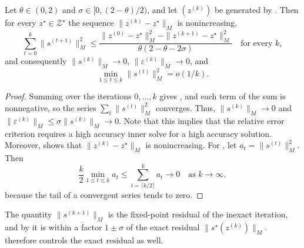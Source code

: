 \documentclass[11pt]{article}
\begin{document}
\begin{theorem}\label{thm:relative-error-criterion}
    Let $\theta \in (0, 2)$ and $\sigma \in [0, (2-\theta)/2)$, and let $(z^{(k)})$ be generated by .
    Then for every $z^\star \in \mathcal{Z}^\star$ the sequence $\|z^{(k)} - z^\star\|_M$ is nonincreasing,
    \begin{equation}\label{eq:convergence-of-fixed-point-residual}
        \sum_{t=0}^{k}\|s^{(t+1)}\|^2_M \leq \frac{\|z^{(0)} - z^\star\|_M^2 - \|z^{(k+1)} - z^\star\|_M^2}{\theta(2-\theta-2\sigma)}
        \quad\text{for every } k,
    \end{equation}
    and consequently $\|s^{(k)}\|_M \to 0$, $\|\varepsilon^{(k)}\|_M \to 0$, and
    \begin{equation}\label{eq:small-o-rate}
        \min_{1 \leq t \leq k} \|s^{(t)}\|_M^2 = o(1/k).
    \end{equation}
\end{theorem}
\begin{proof}
    Summing  over the iterations $0, \ldots, k$ gives , and each term of the sum is nonnegative, so the series $\sum_t \|s^{(t)}\|_M^2$ converges.
    Thus, $\|s^{(k)}\|_M \to 0$ and $\|\varepsilon^{(k)}\|_M \leq \sigma\|s^{(k)}\|_M \to 0$.
    Note that this implies that the relative error criterion requires a high accuracy inner solve for a high accuracy solution.
    Moreover,  shows that $\|z^{(k)} - z^\star\|_M$ is nonincreasing.
    For , let $a_t = \|s^{(t)}\|_M^2$.
    Then
    \begin{equation*}
        \frac{k}{2}\min_{1 \leq t \leq k} a_t \leq \sum_{t = \lceil k/2 \rceil}^{k} a_t \to 0 \quad\text{as } k \to \infty,
    \end{equation*}
    because the tail of a convergent series tends to zero.
\end{proof}
\begin{remark}
    The quantity $\|s^{(k+1)}\|_M$ is the fixed-point residual of the inexact iteration, and by  it is within a factor $1 \pm \sigma$ of the exact residual $\|s^\star(z^{(k)})\|_M$.
     therefore controls the exact residual as well.
\end{remark}
\end{document}
